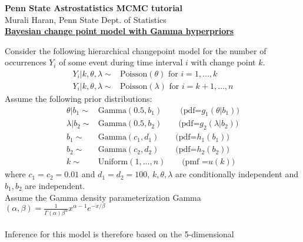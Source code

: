 \documentclass[11pt]{article}
\begin{document}
\pagestyle{empty}
\begin{center}
\Large
{\bf Penn State Astrostatistics MCMC tutorial} \\
\large
Murali Haran, Penn State Dept. of Statistics \\\vspace{0.2in}
{\bf  \underline{Bayesian change point model with Gamma hyperpriors}}\\
\end{center}
\normalsize
Consider the following hierarchical changepoint model for the number
of occurrences $Y_i$ of some event during time interval $i$ with change point $k$.
\begin{equation*}
\begin{split}
Y_i |k,\theta,\lambda \sim & \mbox{Poisson}(\theta) \mbox{ for } i=1,\dots,k\\
Y_i |k,\theta,\lambda \sim & \mbox{Poisson}(\lambda) \mbox{ for } i=k+1,\dots,n
\end{split}
\end{equation*}
Assume the following prior distributions:
\begin{equation*}
\begin{split}
  \theta|b_1 \sim & \mbox{Gamma}(0.5,b_1)\:\:\:\:\:\:\:\:\:\:\mbox{(pdf=} g_1(\theta|b_1))\\
  \lambda|b_2 \sim &  \mbox{Gamma}(0.5,b_2)\:\:\:\:\:\:\:\:\: \mbox{(pdf=} g_2(\lambda|b_2))\\
  b_1 \sim & \mbox{Gamma}(c_1,d_1)\:\:\:\:\:\:\:\:\: \mbox{(pdf=} h_1(b_1))\\
  b_2 \sim & \mbox{Gamma}(c_2,d_2)\:\:\:\:\:\:\:\:\: \mbox{(pdf=} h_2(b_2))\\
  k \sim & \mbox{Uniform}(1,\dots,n)\:\:\:\:\:\:\:\:\: \mbox{(pmf =} u(k))
\end{split}
\end{equation*}
where $c_1=c_2=0.01$ and $d_1=d_2=100$, $k,\theta,\lambda$ are conditionally independent and $b_1,b_2$ are independent. \\ Assume the Gamma density parameterization Gamma$(\alpha,\beta) = \frac{1}{\Gamma(\alpha)\beta^{\alpha}} x^{\alpha-1} e^{-x/\beta}$\\\\
Inference for this model is therefore based on the 5-dimensional
\end{document}
